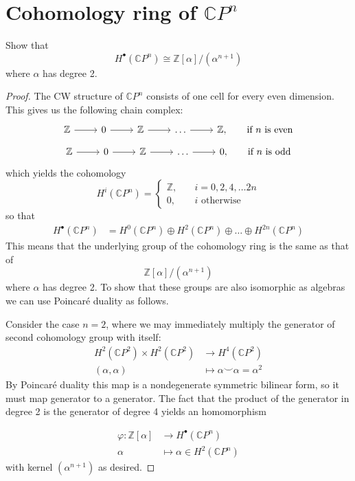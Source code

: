 \documentclass{article}
\numberwithin{equation}{section}
\newcommand{\Z}{\mathbb{Z}}
\newcommand{\C}{\mathbb{C}}
\begin{document}
\section{Cohomology ring of $\C P^n$}
	\begin{exercise}
	Show that
	\[H^\bullet(\C P^n)\cong \Z[\alpha]/(\alpha^{n+1})\]
	where $\alpha$ has degree 2.
\end{exercise}
\begin{proof}
	The CW structure of $\C P^n$ consists of one cell for every even dimension. This gives us the following chain complex:
	\[\begin{tikzcd}
		\Z\arrow[r]&0\arrow[r]&\Z\arrow[r]&\ldots\arrow[r]&\Z,\qquad\text{if }n\text{ is even}
	\end{tikzcd}\]
	\[\begin{tikzcd}
		\Z\arrow[r]&0\arrow[r]&\Z\arrow[r]&\ldots\arrow[r]&0,\qquad\text{if }n\text{ is odd}
	\end{tikzcd}\]
	which yields the cohomology
	\[H^i(\C P^n)=\begin{cases}
		\Z,\quad&i=0,2,4,\ldots 2n\\
		0,\quad&i\text{ otherwise}
	\end{cases}\]
	so that
	\begin{align*}
		H^\bullet(\C P^n)&=H^0(\C P^n)\oplus H^2(\C P^n)\oplus\ldots\oplus H^{2n}(\C P^{n})
	\end{align*}
	This means that the underlying group of the cohomology ring is the same as that of
	\[\Z[\alpha]/(\alpha^{n+1})\]
	where $\alpha$ has degree 2. To show that these groups are also isomorphic as algebras we can use Poincar\'e duality as follows.
	
	Consider the case $n=2$, where we may immediately multiply the generator of second cohomology group with itself:
	\begin{align*}
		H^2(\C P^2)\times H^2(\C P^2)&\to H^4(\C P^2)\\
		(\alpha,\alpha)\qquad\quad&\mapsto\alpha\smile\alpha =\alpha^2
	\end{align*}
	By Poincar\'e duality this map is a nondegenerate symmetric bilinear form, so it must map generator to a generator. {\color{blue-violet}The fact that the product of the generator in degree 2 is the generator of degree 4} yields an homomorphism
	\iffalse\begin{align*}
		\varphi:H^\bullet(\C P^n)&\to\Z[\alpha]/(\alpha^{n+1})\\
		H^2(\C P^n)\ni\alpha&\mapsto\alpha
	\end{align*}
	satisfying
	\[\varphi(\alpha\smile\alpha)=\varphi()\]\fi
	\begin{align*}
		\varphi:\Z[\alpha]&\to H^\bullet(\C P^n)\\
		\alpha&\mapsto\alpha\in H^2(\C P^n)
	\end{align*}
	with kernel $(\alpha^{n+1})$ as desired.
	

\end{proof}
\end{document}
